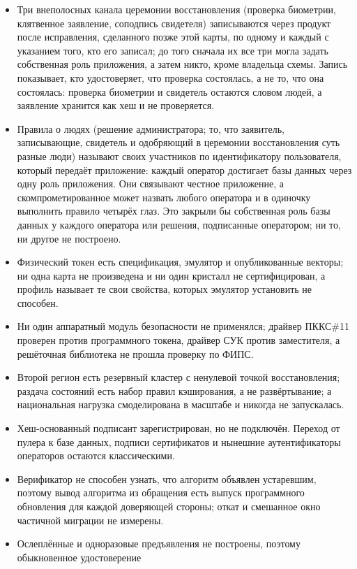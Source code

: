 \begin{itemize}
  \item Три внеполосных канала церемонии восстановления (проверка биометрии, клятвенное
    заявление, соподпись свидетеля) записываются через продукт после исправления, сделанного позже
    этой карты, по одному и каждый с указанием того, кто его записал; до того сначала их все три
    могла задать собственная роль приложения, а затем никто, кроме владельца схемы. Запись
    показывает, кто удостоверяет, что проверка состоялась, а не то, что она состоялась: проверка
    биометрии и свидетель остаются словом людей, а заявление хранится как хеш и не проверяется.
  \item Правила о людях (решение администратора; то, что заявитель, записывающие, свидетель и
    одобряющий в церемонии восстановления суть разные люди) называют своих участников по
    идентификатору пользователя, который передаёт приложение: каждый оператор достигает базы данных
    через одну роль приложения. Они связывают честное приложение, а скомпрометированное может
    назвать любого оператора и в одиночку выполнить правило четырёх глаз. Это закрыли бы
    собственная роль базы данных у каждого оператора или решения, подписанные оператором; ни то, ни
    другое не построено.
  \item Физический токен есть спецификация, эмулятор и опубликованные векторы; ни одна карта не
    произведена и ни один кристалл не сертифицирован, а профиль называет те свои свойства, которых
    эмулятор установить не способен.
  \item Ни один аппаратный модуль безопасности не применялся; драйвер ПККС\#11 проверен против
    программного токена, драйвер СУК против заместителя, а решёточная библиотека не прошла
    проверку по ФИПС.
  \item Второй регион есть резервный кластер с ненулевой точкой восстановления; раздача состояний
    есть набор правил кэширования, а не развёртывание; а национальная нагрузка смоделирована в
    масштабе и никогда не запускалась.
  \item Хеш-основанный подписант зарегистрирован, но не подключён. Переход от пулера к базе
    данных, подписи сертификатов и нынешние аутентификаторы операторов остаются классическими.
  \item Верификатор не способен узнать, что алгоритм объявлен устаревшим, поэтому вывод
    алгоритма из обращения есть выпуск программного обновления для каждой доверяющей стороны;
    откат и смешанное окно частичной миграции не измерены.
  \item Ослеплённые и одноразовые предъявления не построены, поэтому обыкновенное удостоверение

\end{itemize}
